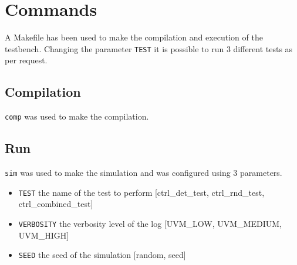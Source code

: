 \chapter{Commands} 
\label{cha:commands}

A Makefile has been used to make the compilation and execution of the testbench.
Changing the parameter \texttt{TEST} it is possible to run 3 different tests as per request.

\section{Compilation}

\texttt{comp} was used to make the compilation.



\section{Run}

\texttt{sim} was used to make the simulation and was configured using 3 parameters.

\begin{itemize}
    \item \texttt{TEST} the name of the test to perform [ctrl\_det\_test, ctrl\_rnd\_test, ctrl\_combined\_test]
    \item \texttt{VERBOSITY} the verbosity level of the log [UVM\_LOW, UVM\_MEDIUM, UVM\_HIGH]
    \item \texttt{SEED} the seed of the simulation [random, seed]
\end{itemize}

